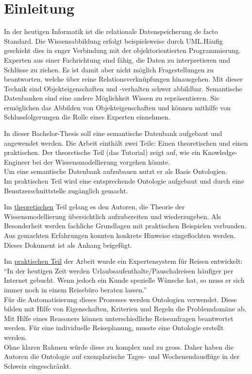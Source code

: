 \chapter{Einleitung}
\label{chap:einleitung}


In der heutigen Informatik ist die relationale Datenspeicherung de facto Standard. Die Wissensabbildung erfolgt beispielsweise durch UML.\@ Häufig geschieht dies in enger Verbindung mit der objektorientierten Programmierung. Experten aus einer Fachrichtung sind fähig, die Daten zu interpretieren und Schlüsse zu ziehen. Es ist damit aber nicht möglich Fragestellungen zu beantworten, welche über reine Relationsverknüpfungen hinausgehen. Mit dieser Technik sind Objekteigenschaften und -verhalten schwer abbildbar. Semantische Datenbanken sind eine andere Möglichkeit Wissen zu repräsentieren. Sie ermöglichen das Abbilden von Objekteigenschaften und können mithilfe von Schlussfolgerungen die Rolle eines Experten einnehmen.

In dieser Bachelor-Thesis soll eine semantische Datenbank aufgebaut und angewendet werden.  Die Arbeit einthält zwei Teile: Einen theoretischen und einen praktischen. Der theoretische Teil (das Tutorial) zeigt auf, wie ein Knowledge-Engineer bei der Wissensmodellierung vorgehen könnte.\\
Um eine semantische Datenbank aufzubauen nutzt er als Basis Ontologien.\\
Im praktischen Teil wird eine entsprechende Ontologie aufgebaut und durch eine Benutzerschnittstelle zugänglich gemacht.

Im \underline{theoretischen} Teil gelang es den Autoren, die Theorie der Wissensmodellierung übersichtlich aufzubereiten und wiederzugeben. Als Besonderheit werden fachliche Grundlagen mit praktischen Beispielen verbunden. Aus gemachten Erfahrungen konnten konkrete Hinweise eingeflochten werden. Dieses Dokument ist als Anhang beigefügt.

Im \underline{praktischen Teil} der Arbeit wurde ein Expertensystem für Reisen entwickelt: ``In der heutigen Zeit werden Urlaubsaufenthalte/Pauschalreisen häufiger per Internet gebucht. Wenn jedoch ein Kunde spezielle Wünsche hat, so muss er sich immer noch in einem Reisebüro beraten lassen.''\\
Für die Automatisierung dieses Prozesses werden Ontologien verwendet. Diese bilden mit Hilfe von Eigenschaften, Kriterien und Regeln die Problemdomäne ab. Mit Hilfe eines Reasoners können unterschiedliche Reiseanfragen beantwortet werden. Für eine individuelle Reiseplanung, musste eine Ontologie erstellt werden.\\
Ohne klaren Rahmen würde diese zu komplex und zu gross. Daher haben die Autoren die Ontologie auf exemplarische Tages- und Wochenendausflüge in der Schweiz eingeschränkt.

